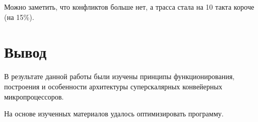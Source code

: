 \documentclass{article}
\begin{document}
Можно заметить, что конфликтов больше нет, а трасса стала на 10 такта короче (на 15\%).

\section{Вывод}
В результате данной работы были изучены принципы функционирования, построения и особенности архитектуры 
суперскалярных конвейерных микропроцессоров.

На основе изученных материалов удалось оптимизировать программу.
\end{document}
